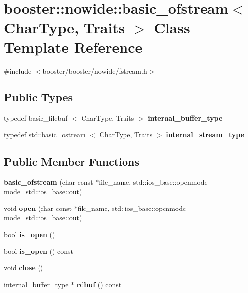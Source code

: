 \section{booster\-:\-:nowide\-:\-:basic\-\_\-ofstream$<$ \-Char\-Type, \-Traits $>$ \-Class \-Template \-Reference}
\label{classbooster_1_1nowide_1_1basic__ofstream}


{\ttfamily \#include $<$booster/booster/nowide/fstream.\-h$>$}

\subsection*{\-Public \-Types}
\begin{DoxyCompactItemize}
\item 
typedef basic\-\_\-filebuf\*
$<$ \-Char\-Type, \-Traits $>$ {\bfseries internal\-\_\-buffer\-\_\-type}\label{classbooster_1_1nowide_1_1basic__ofstream_abb81c9368f20f17ace9841b4153723c8}

\item 
typedef std\-::basic\-\_\-ostream\*
$<$ \-Char\-Type, \-Traits $>$ {\bfseries internal\-\_\-stream\-\_\-type}\label{classbooster_1_1nowide_1_1basic__ofstream_a4cf9219d4d52d5598ad7cf55c225d153}

\end{DoxyCompactItemize}
\subsection*{\-Public \-Member \-Functions}
\begin{DoxyCompactItemize}
\item 
{\bfseries basic\-\_\-ofstream} (char const $\ast$file\-\_\-name, std\-::ios\-\_\-base\-::openmode mode=std\-::ios\-\_\-base\-::out)\label{classbooster_1_1nowide_1_1basic__ofstream_ad179dbb18e7d03ac16e49860b53d8d06}

\item 
void {\bfseries open} (char const $\ast$file\-\_\-name, std\-::ios\-\_\-base\-::openmode mode=std\-::ios\-\_\-base\-::out)\label{classbooster_1_1nowide_1_1basic__ofstream_a7c0bbc97ff23f14759536c32777a643f}

\item 
bool {\bfseries is\-\_\-open} ()\label{classbooster_1_1nowide_1_1basic__ofstream_aee64c68ef40f50491942f3b67bb25d3c}

\item 
bool {\bfseries is\-\_\-open} () const \label{classbooster_1_1nowide_1_1basic__ofstream_afbaf63149f90c1f8b07dd00d602f8470}

\item 
void {\bfseries close} ()\label{classbooster_1_1nowide_1_1basic__ofstream_ad7b1e793f9519061b9afca86e6eb587d}

\item 
internal\-\_\-buffer\-\_\-type $\ast$ {\bfseries rdbuf} () const \label{classbooster_1_1nowide_1_1basic__ofstream_a339a5fe76e56123ae0095ca98f016866}

\end{DoxyCompactItemize}



